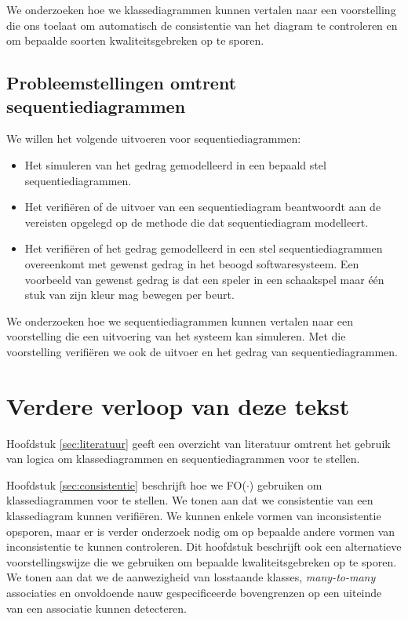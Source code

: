 We onderzoeken hoe we klassediagrammen kunnen vertalen naar een voorstelling die ons toelaat om automatisch de consistentie van het diagram te controleren en om bepaalde soorten kwaliteitsgebreken op te sporen.

\subsection{Probleemstellingen omtrent sequentiediagrammen}

We willen het volgende uitvoeren voor sequentiediagrammen:

\begin{itemize}
	\item Het simuleren van het gedrag gemodelleerd in een bepaald stel sequentiediagrammen.
	\item Het verifi\"eren of de uitvoer van een sequentiediagram beantwoordt aan de vereisten opgelegd op de methode die dat sequentiediagram modelleert.
	\item Het verifi\"eren of het gedrag gemodelleerd in een stel sequentiediagrammen overeenkomt met gewenst gedrag in het beoogd softwaresysteem. Een voorbeeld van gewenst gedrag is dat een speler in een schaakspel maar \'e\'en stuk van zijn kleur mag bewegen per beurt.
\end{itemize}

We onderzoeken hoe we sequentiediagrammen kunnen vertalen naar een voorstelling die een uitvoering van het systeem kan simuleren. Met die voorstelling verifi\"eren we ook de uitvoer en het gedrag van sequentiediagrammen.

\section{Verdere verloop van deze tekst}\label{sec:text-structure}

Hoofdstuk \ref{sec:literatuur} geeft een overzicht van literatuur omtrent het gebruik van logica om klassediagrammen en sequentiediagrammen voor te stellen.

Hoofdstuk \ref{sec:consistentie} beschrijft hoe we FO($\cdot$) gebruiken om klassediagrammen voor te stellen. We tonen aan dat we consistentie van een klassediagram kunnen verifi\"eren. We kunnen enkele vormen van inconsistentie opsporen, maar er is verder onderzoek nodig om op bepaalde andere vormen van inconsistentie te kunnen controleren. Dit hoofdstuk beschrijft ook een alternatieve voorstellingswijze die we gebruiken om bepaalde kwaliteitsgebreken op te sporen. We tonen aan dat we de aanwezigheid van losstaande klasses, \textit{many-to-many} associaties en onvoldoende nauw gespecificeerde bovengrenzen op een uiteinde van een associatie kunnen detecteren.

